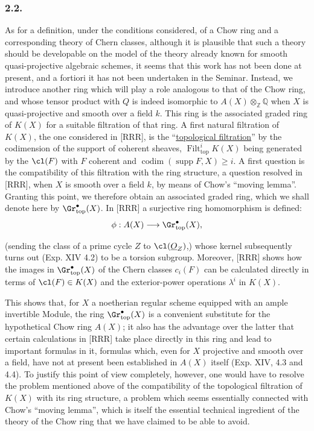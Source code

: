 \subsubsection*{2.2.}
As for a definition, under the conditions considered, of a Chow ring and a corresponding theory of Chern classes, although it is plausible that such a theory should be developable on the model of the theory already known for smooth quasi-projective algebraic schemes, it seems that this work has not been done at present, and a fortiori it has not been undertaken in the Seminar. Instead, we introduce another ring which will play a role analogous to that of the Chow ring, and whose tensor product with $Q$ is indeed isomorphic to $A(X)\otimes_{\mathbb Z}\mathbb Q$ when $X$ is quasi-projective and smooth over a field $k$. This ring is the associated graded ring of $K(X)$ for a suitable filtration of that ring. A first natural filtration of $K(X)$, the one considered in [RRR], is the ``\underline{topological filtration}'' by the codimension of the support of coherent sheaves, $\operatorname{Filt}^{i}_{\mathrm{top}}K(X)$ being generated by the $\cl(F)$ with $F$ coherent and $\operatorname{codim}(\operatorname{supp}F,X)\ge i$. A first question is the compatibility of this filtration with the ring structure, a question resolved in [RRR], when $X$ is smooth over a field $k$, by means of Chow's ``moving lemma''. Granting this point, we therefore obtain an associated graded ring, which we shall denote here by $\Gr^{\bullet}_{\mathrm{top}}(X)$. In [RRR] a surjective ring homomorphism is defined:
\[
\phi:A(X)\longrightarrow \Gr^{\bullet}_{\mathrm{top}}(X),
\]

(sending the class of a prime cycle $Z$ to $\cl(\underline O_Z)$,) whose kernel subsequently turns out (Exp. XIV 4.2) to be a torsion subgroup. Moreover, [RRR] shows how the images in $\Gr^{\bullet}_{\mathrm{top}}(X)$ of the Chern classes $c_i(F)$ can be calculated directly in terms of $\cl(F)\in K(X)$ and the exterior-power operations $\lambda^i$ in $K(X)$.

This shows that, for $X$ a noetherian regular scheme equipped with an ample invertible Module, the ring $\Gr^{\bullet}_{\mathrm{top}}(X)$ is a convenient substitute for the hypothetical Chow ring $A(X)$; it also has the advantage over the latter that certain calculations in [RRR] take place directly in this ring and lead to important formulas in it, formulas which, even for $X$ projective and smooth over a field, have not at present been established in $A(X)$ itself (Exp. XIV, 4.3 and 4.4). To justify this point of view completely, however, one would have to resolve the problem mentioned above of the compatibility of the topological filtration of $K(X)$ with its ring structure, a problem which seems essentially connected with Chow's ``moving lemma'', which is itself the essential technical ingredient of the theory of the Chow ring that we have claimed to be able to avoid.


